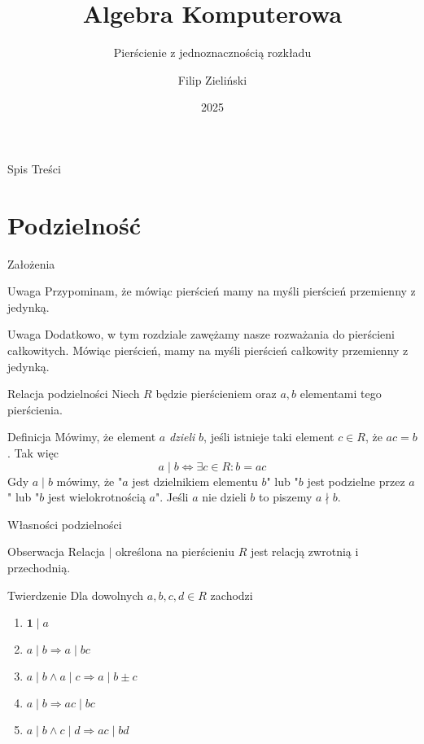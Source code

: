 \documentclass{beamer}
\title{Algebra Komputerowa}
\subtitle{Pierścienie z jednoznacznością rozkładu \cite{Computative1,Gleichgewicht}}
\author{Filip Zieli\'nski}
\date{2025}
\newcommand{\one}{\mathbf{1}}
\begin{document}
\begin{frame}
    \titlepage
\end{frame}
 
\begin{frame}{Spis Treści}
    \tableofcontents
\end{frame}

\section{Podzielność}
\begin{frame}{Założenia}
    \begin{alertblock}{Uwaga}
        Przypominam, że mówiąc pierścień mamy na myśli pierścień przemienny z jedynką. \\
    \end{alertblock}
    \pause
    \begin{alertblock}{Uwaga}
        Dodatkowo, w tym rozdziale zawężamy nasze rozważania do pierścieni całkowitych. Mówiąc pierścień, mamy na myśli pierścień całkowity przemienny z jedynką.
    \end{alertblock}
\end{frame}

\begin{frame}{Relacja podzielności}
    Niech $R$ będzie pierścieniem oraz $a,b$ elementami tego pierścienia.
    \begin{block}{Definicja}
        Mówimy, że element $a$ \textit{dzieli} $b$, jeśli istnieje taki element $c \in R$, że $ac = b$.
        Tak więc 
        $$ a \mid b \Leftrightarrow \exists c \in R : b = ac$$
        Gdy $a \mid b$ mówimy, że "$a$ jest dzielnikiem elementu $b$" lub "$b$ jest podzielne przez $a$" lub "$b$ jest wielokrotnością $a$". Jeśli $a$ nie dzieli $b$ to piszemy $a \nmid b$.
    \end{block}
\end{frame}

\begin{frame}{Własności podzielności}
    \begin{alertblock}{Obserwacja}
        Relacja $\mid$ określona na pierścieniu $R$ jest relacją zwrotnią i przechodnią.
    \end{alertblock}
    \begin{block}{Twierdzenie}
        Dla dowolnych $a,b,c,d \in R$ zachodzi 
        \begin{enumerate}
            \item $\one \mid a$ 
            \item $a \mid b \Rightarrow a \mid bc$ 
            \item $a \mid b \land a \mid c \Rightarrow a \mid b \pm c$
            \item $a \mid b \Rightarrow ac \mid bc$
            \item $a \mid b \land c \mid d \Rightarrow ac \mid bd$
        \end{enumerate}
    \end{block}
\end{frame}
\end{document}

